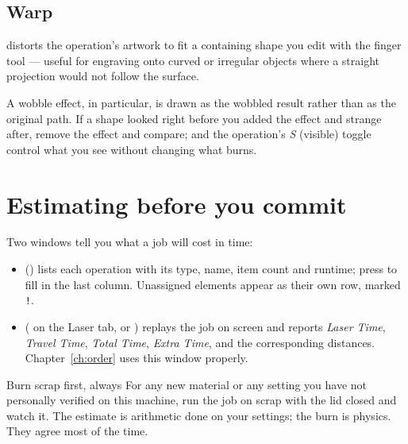 \subsection*{Warp}

 distorts the operation's artwork to fit a
containing shape you edit with the finger tool --- useful for engraving onto
curved or irregular objects where a straight projection would not follow the
surface.

\begin{notebox}
A wobble effect, in particular, is drawn as the wobbled result rather than as
the original path. If a shape looked right before you added the effect and
strange after, remove the effect and compare;  and
the operation's \emph{S} (visible) toggle control what you see without changing
what burns.
\end{notebox}

\section{Estimating before you commit}

Two windows tell you what a job will cost in time:

\begin{itemize}
  \item {} () lists each
        operation with its type, name, item count and runtime; press  to fill in the last column. Unassigned elements appear as their
        own row, marked \texttt{!}.
  \item {} ( on the Laser tab, or 
        ) replays the job on screen and reports
        \emph{Laser Time}, \emph{Travel Time}, \emph{Total Time},
        \emph{Extra Time}, and the corresponding distances.
        Chapter~\ref{ch:order} uses this window properly.
\end{itemize}

\begin{machinebox}{Burn scrap first, always}
For any new material or any setting you have not personally verified on this
machine, run the job on scrap with the lid closed and watch it. The estimate is
arithmetic done on your settings; the burn is physics. They agree most of the
time.
\end{machinebox}

